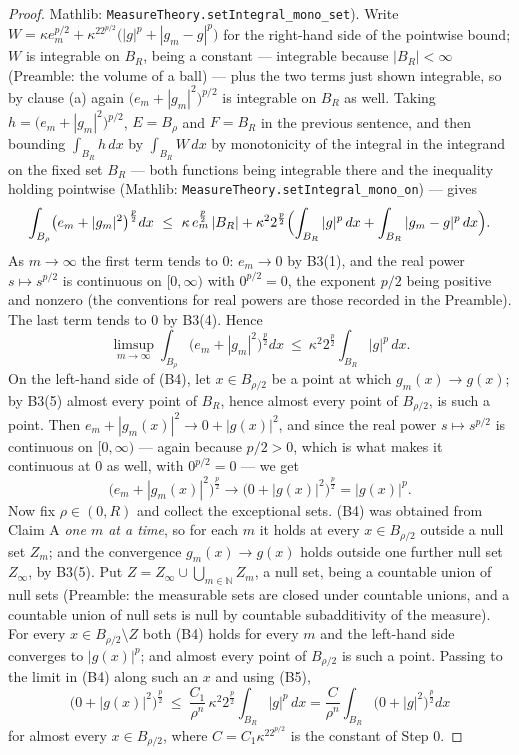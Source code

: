 \begin{proof}
Mathlib: \texttt{MeasureTheory.setIntegral\_mono\_set}).  Write
$W=\kappa e_m^{p/2}+\kappa^22^{p/2}\bigl(|g|^p+|g_m-g|^p\bigr)$ for the
right-hand side of the pointwise bound; $W$ is integrable on $B_R$, being a
constant --- integrable because $|B_R|<\infty$ (Preamble: the volume of a
ball) --- plus the two terms just shown
integrable, so by clause (a) again $\bigl(e_m+|g_m|^2\bigr)^{p/2}$ is integrable
on $B_R$ as well.  Taking $h=\bigl(e_m+|g_m|^2\bigr)^{p/2}$, $E=B_\rho$ and
$F=B_R$ in the previous sentence, and then bounding $\int_{B_R}h\,dx$ by
$\int_{B_R}W\,dx$ by monotonicity of the integral in the integrand on the fixed
set $B_R$ --- both functions being integrable there and the inequality holding
pointwise (Mathlib: \texttt{MeasureTheory.setIntegral\_mono\_on}) --- gives
\[
\int_{B_\rho}\bigl(e_m+|g_m|^2\bigr)^{\frac p2}dx
\ \le\ \kappa\,e_m^{\frac p2}\,|B_R|
+\kappa^2 2^{\frac p2}\Bigl(\int_{B_R}|g|^p\,dx+\int_{B_R}|g_m-g|^p\,dx\Bigr).
\]
As $m\to\infty$ the first term tends to $0$: $e_m\to0$ by B3(1), and the real
power $s\mapsto s^{p/2}$ is continuous on $[0,\infty)$ with $0^{p/2}=0$, the
exponent $p/2$ being positive and nonzero (the conventions for real powers are
those recorded in the Preamble).  The last term tends to $0$ by B3(4).  Hence
\[
\limsup_{m\to\infty}\int_{B_\rho}\bigl(e_m+|g_m|^2\bigr)^{\frac p2}dx
\ \le\ \kappa^2 2^{\frac p2}\int_{B_R}|g|^p\,dx .
\tag{B5}
\]
On the left-hand side of (B4), let $x\in B_{\rho/2}$ be a point at which
$g_m(x)\to g(x)$; by B3(5) almost every point of $B_R$, hence almost every point
of $B_{\rho/2}$, is such a point.  Then
$e_m+|g_m(x)|^2\to0+|g(x)|^2$, and since the real power $s\mapsto s^{p/2}$ is continuous on
$[0,\infty)$ --- again because $p/2>0$, which is what makes it continuous at $0$
as well, with $0^{p/2}=0$ --- we get
\[
\bigl(e_m+|g_m(x)|^2\bigr)^{\frac p2}\longrightarrow
\bigl(0+|g(x)|^2\bigr)^{\frac p2}=|g(x)|^p .
\]
Now fix $\rho\in(0,R)$ and collect the exceptional sets.  (B4) was obtained
from Claim A \emph{one $m$ at a time}, so for each $m$ it holds at every
$x\in B_{\rho/2}$ outside a null set $Z_m$; and the convergence
$g_m(x)\to g(x)$ holds outside one further null set $Z_\infty$, by B3(5).  Put
$Z=Z_\infty\cup\bigcup_{m\in\mathbb{N}}Z_m$, a null set, being a countable union of null
sets (Preamble: the measurable sets are closed under countable unions, and a
countable union of null sets is null by countable subadditivity of the measure).
For every $x\in B_{\rho/2}\setminus Z$ both (B4) holds for every $m$ and the
left-hand side converges to $|g(x)|^p$; and almost every point of $B_{\rho/2}$
is such a point.  Passing to the limit in (B4) along such an $x$ and
using (B5),
\[
\bigl(0+|g(x)|^2\bigr)^{\frac p2}\ \le\ \frac{C_1}{\rho^n}\,\kappa^2 2^{\frac p2}
\int_{B_R}|g|^p\,dx
=\frac{C}{\rho^n}\int_{B_R}\bigl(0+|g|^2\bigr)^{\frac p2}dx
\tag{B6}
\]
for almost every $x\in B_{\rho/2}$, where $C=C_1\kappa^22^{p/2}$ is the constant
of Step 0.


\end{proof}
